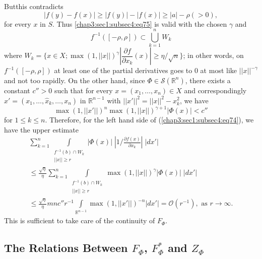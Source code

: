 But\pageoriginale this contradicts
$$
|f(y)-f(x)|\geq |f(y)|-|f(x)|\geq |a|-\rho(>0),
$$
for every $x$ in $S$. Thus \ref{chap3:sec1:subsec4:eq75} is valid with the chosen
$\gamma$ and 
$$
f^{-1}([-\rho,\rho])\subset\bigcup^{n}_{k=1}W_{k}
$$
where $W_{k}=\{x\in X;\max(1,||x||)^{\gamma}\left|\dfrac{\partial
  f}{\partial x_{k}}(x)\right|\geq \eta/\sqrt{n}\}$; in other words,
on $f^{-1}([-\rho,\rho])$ at least one of the partial derivatives goes
to $0$ at most like $||x||^{-\gamma}$ and not too rapidly. On the
other hand, since $\Phi\in\mathscr{S}(\mathbb{R}^{n})$, there exists a
constant $c''>0$ such that for every $x=(x_{1},\ldots,x_{n})\in X$ and
correspondingly $x'=(x_{1},\ldots,\hat{x}_{k},\ldots,x_{n})$ in
$\mathbb{R}^{n-1}$ with $||x'||^{2}=||x||^{2}-x^{2}_{k}$, we have
$$
\max(1,||x'||)^{n}\max (1,||x||)^{\gamma+1}|\Phi(x)|<c''
$$
for $1\leq k\leq n$. Therefore, for the left hand side of
(\ref{chap3:sec1:subsec4:eq74}), we have the upper estimate
\begin{multline*}
  \sum^{n}_{k=1}\int\limits_{\substack{f^{-1}(b)\cap W_{k}\\ ||x||\geq
      r}}|\Phi(x)|\;|1/\frac{\partial f(x)}{\partial x_{k}}|\; |dx'|\\
  \leq \frac{\sqrt{\eta}}{\eta} \sum\limits^{n}_{k=1} 
  \int\limits_{\substack{f^{-1}(b)\cap
    W_{k}\\ ||x||\geq r}}\max (1,||x||)^{\gamma}|\Phi(x)|\;|dx'|\\
  \leq \frac{\sqrt{\eta}}{\eta}mnc''r^{-1}\int\limits_{\mathbb{R}^{n-1}}
  \max(1,||x'||)^{-n}|dx'|=\mathcal{O}(r^{-1}),
  \text{   as  } r \to\infty. 
\end{multline*}
This is sufficient to take care of the continuity of $F_{\Phi}$.

\subsection{The Relations Between $F_{\Phi}$, $F^{\ast}_{\Phi}$ and
  $Z_{\Phi}$}\label{chap3:sec1:subsec5} %

